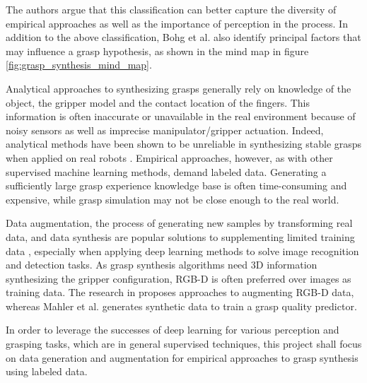The authors argue that this classification can better capture the diversity of empirical approaches as well as
the importance of perception in the process. In addition to the above classification, Bohg et al. \cite{Bohg2014}
also identify principal factors that may influence a grasp hypothesis, as shown in the mind map in figure
\ref{fig:grasp_synthesis_mind_map}.

Analytical approaches to synthesizing grasps generally rely on knowledge of the object, the gripper model and the
contact location of the fingers. This information is often inaccurate or unavailable in the real environment
because of noisy sensors as well as imprecise manipulator/gripper actuation. Indeed, analytical methods have been
shown to be unreliable in synthesizing stable grasps when applied on real robots
\cite{Kappler2015,Rubert2017,WeiszAllen2012}. Empirical approaches, however, as with other supervised machine
learning methods, demand labeled data. Generating a sufficiently large grasp experience knowledge base is often
time-consuming and expensive, while grasp simulation may not be close enough to the real world.

Data augmentation, the process of generating new samples by transforming real data, and data synthesis are popular
solutions to supplementing limited training data \cite{Fawzi2016,Shrivastava2017}, especially when applying deep
learning methods to solve image recognition and detection tasks. As grasp synthesis algorithms need 3D information
synthesizing the gripper configuration, RGB-D is often preferred over images as training data. The research in
\cite{Eitel2015,Gupta2014RGBDFeatures} proposes approaches to augmenting RGB-D data, whereas Mahler et al.
\cite{mahler2017} generates synthetic data to train a grasp quality predictor.

In order to leverage the successes of deep learning for various perception and grasping tasks, which are in general
supervised techniques, this project shall focus on data generation and augmentation for empirical approaches to grasp
synthesis using labeled data.

